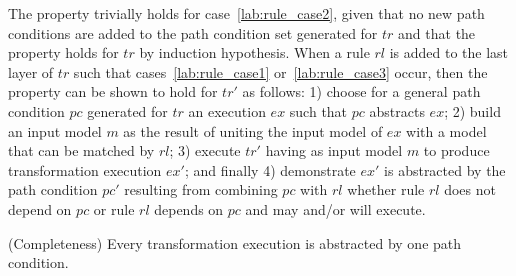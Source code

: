 \begin{ps}
\begin{itemize}
The property trivially holds for case~\ref{lab:rule_case2}, given that no new path conditions are added to the path condition set generated for $tr$ and that the property holds for $tr$ by induction hypothesis. When a rule $rl$ is added to the last layer of $tr$ such that cases~\ref{lab:rule_case1} or~\ref{lab:rule_case3} occur, then the property can be shown to hold for $tr'$ as follows: 1) choose for a general path condition $pc$ generated for $tr$ an execution $ex$ such that $pc$ abstracts $ex$; 2) build an input model $m$ as the result of uniting the input model of $ex$ with a model that can be matched by $rl$; 3) execute $tr'$ having as input model $m$ to produce transformation execution $ex'$; and finally 4) demonstrate $ex'$ is abstracted by the path condition $pc'$ resulting from combining $pc$ with $rl$ whether rule $rl$ does not depend on $pc$ or rule $rl$ depends on $pc$ and may and/or will execute.
\end{itemize}
\end{ps} 


\begin{proposition}{(Completeness)}
\label{prop:pc_completeness}
Every transformation execution is abstracted by one path condition.
\end{proposition}

